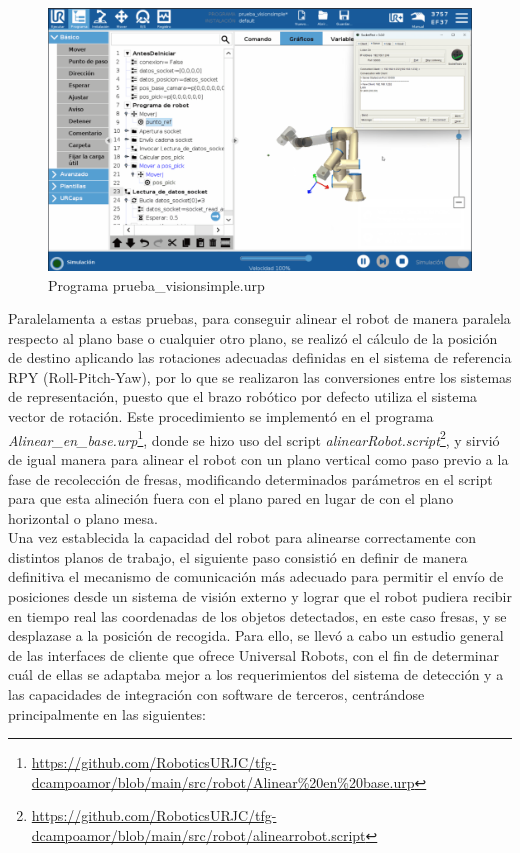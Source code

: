   \begin{figure}[H]
     \centering
     \begin{center}
       \includegraphics[width=130mm]{figs/prueba_visionsimple.png}
     \end{center}
     \caption{Programa prueba\_visionsimple.urp}
     \label{fig:prueba_visionsimple}
  \end{figure}
  
Paralelamenta a estas pruebas, para conseguir alinear el robot de manera paralela respecto al plano base o cualquier otro plano, se realizó el cálculo de la posición de destino aplicando las rotaciones adecuadas definidas en el sistema de referencia RPY (Roll-Pitch-Yaw), por lo que se realizaron las conversiones entre los sistemas de representación, puesto que el brazo robótico por defecto utiliza el sistema vector de rotación. Este procedimiento se implementó en el programa \textit{Alinear\_en\_base.urp}\footnote{\url{https://github.com/RoboticsURJC/tfg-dcampoamor/blob/main/src/robot/Alinear\%20en\%20base.urp}}, donde se hizo uso del script \textit{alinearRobot.script}\footnote{\url{https://github.com/RoboticsURJC/tfg-dcampoamor/blob/main/src/robot/alinearrobot.script}}, y sirvió de igual manera para alinear el robot con un plano vertical como paso previo a la fase de recolección de fresas, modificando determinados parámetros en el script para que esta alineción fuera con el plano pared en lugar de con el plano horizontal o plano mesa.\\

Una vez establecida la capacidad del robot para alinearse correctamente con distintos planos de trabajo, el siguiente paso consistió en definir de manera definitiva el mecanismo de comunicación más adecuado para permitir el envío de posiciones desde un sistema de visión externo y lograr que el robot pudiera recibir en tiempo real las coordenadas de los objetos detectados, en este caso fresas, y se desplazase a la posición de recogida. Para ello, se llevó a cabo un estudio general de las interfaces de cliente que ofrece Universal Robots, con el fin de determinar cuál de ellas se adaptaba mejor a los requerimientos del sistema de detección y a las capacidades de integración con software de terceros, centrándose principalmente en las siguientes:


